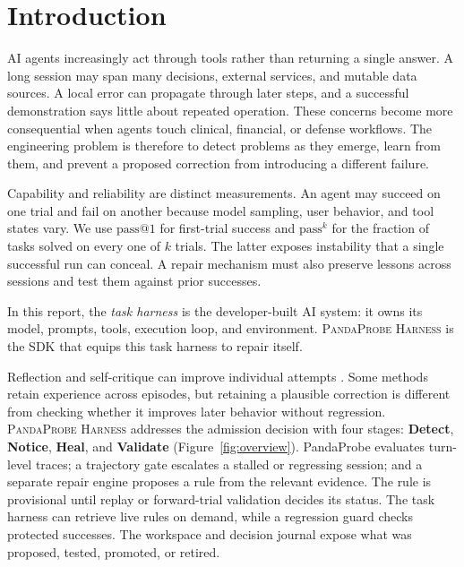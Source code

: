 \documentclass[11pt,letterpaper]{article}
\makeatletter
\newcommand{\passk}{\mathrm{pass}^{k}}
\newcommand{\passone}{\mathrm{pass@}1}
\newcommand{\Harness}{\textsc{PandaProbe Harness}\xspace}
\makeatother
\begin{document}
\section{Introduction}
\label{sec:intro}

AI agents increasingly act through tools rather than returning a single answer.
A long session may span many decisions, external services, and mutable data
sources. A local error can propagate through later steps, and a successful
demonstration says little about repeated operation. These concerns become more
consequential when agents touch clinical, financial, or defense workflows. The
engineering problem is therefore to detect problems as they emerge, learn from
them, and prevent a proposed correction from introducing a different failure.

Capability and reliability are distinct measurements. An agent may succeed on
one trial and fail on another because model sampling, user behavior, and tool
states vary. We use $\passone$ for first-trial success and $\passk$ for the
fraction of tasks solved on every one of $k$ trials. The latter exposes
instability that a single successful run can conceal. A repair mechanism must
also preserve lessons across sessions and test them against prior successes.

In this report, the \emph{task harness} is the developer-built AI system:
it owns its model, prompts, tools, execution loop, and environment.
\Harness is the SDK that equips this task harness to repair itself.

Reflection and self-critique can improve individual attempts
\citep{shinn2023reflexion,madaan2023selfrefine,gou2024critic}. Some methods
retain experience across episodes, but retaining a plausible correction is
different from checking whether it improves later behavior without regression.
\Harness addresses the admission
decision with four stages: \textbf{Detect}, \textbf{Notice}, \textbf{Heal}, and
\textbf{Validate} (Figure~\ref{fig:overview}). PandaProbe evaluates turn-level
traces; a trajectory gate escalates a stalled or regressing session; and a
separate repair engine proposes a rule from the relevant evidence. The rule is
provisional until replay or forward-trial validation decides its status. The
task harness can retrieve live rules on demand, while a regression guard
checks protected successes. The workspace and decision journal expose what was
proposed, tested, promoted, or retired.
\end{document}
